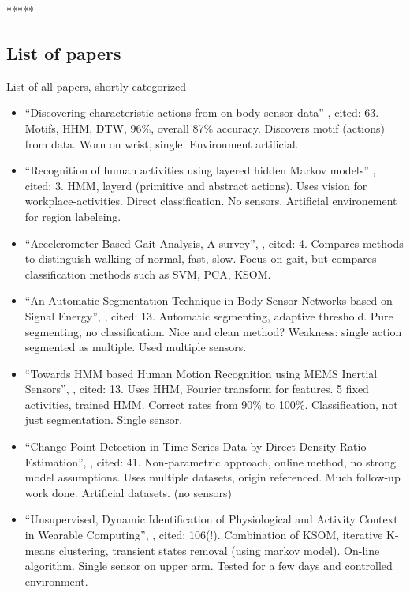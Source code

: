 
*****
\subsection{List of papers}
List of all papers, shortly categorized
\begin{itemize}
  \item ``Discovering characteristic actions from on-body sensor data'' \cite{minnen2006discovering}, cited: 63. Motifs, HHM, DTW, 96\%, overall 87\% accuracy. Discovers motif (actions) from data. Worn on wrist, single. Environment artificial.
  \item ``Recognition of human activities using layered hidden Markov models'' \cite{perdikis2008recognition}, cited: 3. HMM, layerd (primitive and abstract actions). Uses vision for workplace-activities. Direct classification. No sensors. Artificial environement for region labeleing.
  \item ``Accelerometer-Based Gait Analysis, A survey'', \cite{derawi2010accelerometer}, cited: 4. Compares methods to distinguish walking of normal, fast, slow. Focus on gait, but compares classification methods such as SVM, PCA, KSOM.
  \item ``An Automatic Segmentation Technique in Body Sensor Networks based on Signal Energy'', \cite{guenterberg2009automatic}, cited: 13. Automatic segmenting, adaptive threshold. Pure segmenting, no classification. Nice and clean method? Weakness: single action segmented as multiple. Used multiple sensors.
  \item ``Towards HMM based Human Motion Recognition using MEMS Inertial Sensors'', \cite{shi2009towards}, cited: 13. Uses HHM, Fourier transform for features. 5 fixed activities, trained HMM. Correct rates from 90\% to 100\%. Classification, not just segmentation. Single sensor.
  \item ``Change-Point Detection in Time-Series Data by Direct Density-Ratio Estimation'', \cite{kawahara2009change}, cited: 41. Non-parametric approach, online method, no strong model assumptions. Uses multiple datasets, origin referenced. Much follow-up work done. Artificial datasets. (no sensors)
  \item ``Unsupervised, Dynamic Identification of Physiological and Activity Context in Wearable Computing'', \cite{krause2003unsupervised}, cited: 106(!). Combination of KSOM, iterative K-means clustering, transient states removal (using markov model). On-line algorithm. Single sensor on upper arm. Tested for a few days and controlled environment.

\end{itemize}
